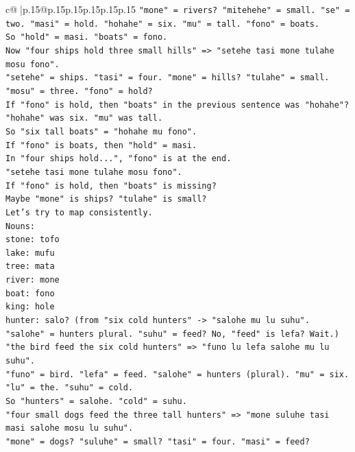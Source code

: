 \documentclass{article}
\begin{document}
{\begin{supertabular}{c@{$\;$}|p{.15\linewidth}@{}p{.15\linewidth}p{.15\linewidth}p{.15\linewidth}p{.15\linewidth}p{.15\linewidth}}
{{{\texttt{"mone" = rivers? "mitehehe" = small. "se" = two. "masi" = hold. "hohahe" = six. "mu" = tall. "fono" = boats.} \\
\texttt{So "hold" = masi. "boats" = fono.} \\
\texttt{Now "four ships hold three small hills" => "setehe tasi mone tulahe mosu fono".} \\
\texttt{"setehe" = ships. "tasi" = four. "mone" = hills? "tulahe" = small. "mosu" = three. "fono" = hold?} \\
\texttt{If "fono" is hold, then "boats" in the previous sentence was "hohahe"?} \\
\texttt{"hohahe" was six. "mu" was tall.} \\
\texttt{So "six tall boats" = "hohahe mu fono".} \\
\texttt{If "fono" is boats, then "hold" = masi.} \\
\texttt{In "four ships hold...", "fono" is at the end.} \\
\texttt{"setehe tasi mone tulahe mosu fono".} \\
\texttt{If "fono" is hold, then "boats" is missing?} \\
\texttt{Maybe "mone" is ships? "tulahe" is small?} \\
\texttt{Let's try to map consistently.} \\
\texttt{Nouns:} \\
\texttt{stone: tofo} \\
\texttt{lake: mufu} \\
\texttt{tree: mata} \\
\texttt{river: mone} \\
\texttt{boat: fono} \\
\texttt{king: hole} \\
\texttt{hunter: salo? (from "six cold hunters" {-}> "salohe mu lu suhu". "salohe" = hunters plural. "suhu" = feed? No, "feed" is lefa? Wait.)} \\
\texttt{"the bird feed the six cold hunters" => "funo lu lefa salohe mu lu suhu".} \\
\texttt{"funo" = bird. "lefa" = feed. "salohe" = hunters (plural). "mu" = six. "lu" = the. "suhu" = cold.} \\
\texttt{So "hunters" = salohe. "cold" = suhu.} \\
\texttt{"four small dogs feed the three tall hunters" => "mone suluhe tasi masi salohe mosu lu suhu".} \\
\texttt{"mone" = dogs? "suluhe" = small? "tasi" = four. "masi" = feed?} \\
}}}
\end{supertabular}}
\end{document}
